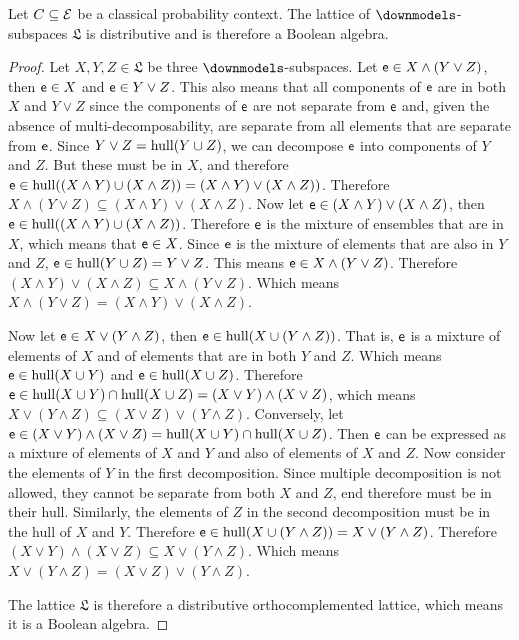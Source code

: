 \begin{prop}
	Let $C \subseteq \mathcal{E}$ be a classical probability context. The lattice of $\separate$-subspaces $\mathfrak{L}$ is distributive and is therefore a Boolean algebra.
\end{prop}

\begin{proof}
	Let $X,Y,Z \in \mathfrak{L}$ be three $\separate$-subspaces. Let $\mathsf{e} \in X \wedge (Y \vee Z)$, then $\mathsf{e} \in X$ and $\mathsf{e} \in Y \vee Z$. This also means that all components of $\mathsf{e}$ are in both $X$ and $Y \vee Z$ since the components of $\mathsf{e}$ are not separate from $\mathsf{e}$ and, given the absence of multi-decomposability, are separate from all elements that are separate from $\mathsf{e}$. Since $Y \vee Z = \mathrm{hull}(Y \cup Z)$, we can decompose $\mathsf{e}$ into components of $Y$ and $Z$. But these must be in $X$, and therefore $\mathsf{e} \in \mathrm{hull}((X \wedge Y) \cup (X \wedge Z) ) = (X \wedge Y) \vee (X \wedge Z) )$. Therefore $X \wedge (Y \vee Z) \subseteq (X \wedge Y) \vee (X \wedge Z)$. Now let $\mathsf{e} \in (X \wedge Y) \vee (X \wedge Z)$, then $\mathsf{e} \in \mathrm{hull}((X \wedge Y) \cup (X \wedge Z) )$. Therefore $\mathsf{e}$ is the mixture of ensembles that are in $X$, which means that $\mathsf{e} \in X$. Since $\mathsf{e}$ is the mixture of elements that are also in $Y$ and $Z$, $\mathsf{e} \in \mathrm{hull}(Y \cup Z) = Y \vee Z$. This means $\mathsf{e} \in X \wedge (Y \vee Z)$. Therefore $(X \wedge Y) \vee (X \wedge Z) \subseteq X \wedge (Y \vee Z)$. Which means $X \wedge (Y \vee Z) = (X \wedge Y) \vee (X \wedge Z)$.
	
	Now let $\mathsf{e} \in X \vee (Y \wedge Z)$, then $\mathsf{e} \in \mathrm{hull}(X \cup (Y \wedge Z) )$. That is, $\mathsf{e}$ is a mixture of elements of $X$ and of elements that are in both $Y$ and $Z$. Which means $\mathsf{e} \in \mathrm{hull}(X \cup Y)$ and $\mathsf{e} \in \mathrm{hull}(X \cup Z)$. Therefore $\mathsf{e} \in \mathrm{hull}(X \cup Y) \cap \mathrm{hull}(X \cup Z) = (X \vee Y) \wedge (X \vee Z)$, which means $X \vee (Y \wedge Z) \subseteq (X \vee Z) \vee (Y \wedge Z)$. Conversely, let $\mathsf{e} \in (X \vee Y) \wedge (X \vee Z) = \mathrm{hull}(X \cup Y) \cap \mathrm{hull}(X \cup Z)$. Then $\mathsf{e}$ can be expressed as a mixture of elements of $X$ and $Y$ and also of elements of $X$ and $Z$. Now consider the elements of $Y$ in the first decomposition. Since multiple decomposition is not allowed, they cannot be separate from both $X$ and $Z$, end therefore must be in their hull. Similarly, the elements of $Z$ in the second decomposition must be in the hull of $X$ and $Y$. Therefore $\mathsf{e} \in \mathrm{hull}(X \cup (Y \wedge Z) ) = X \vee (Y \wedge Z)$. Therefore $(X \vee Y) \wedge (X \vee Z) \subseteq X \vee (Y \wedge Z)$. Which means $X \vee (Y \wedge Z) = (X \vee Z) \vee (Y \wedge Z)$.
	
	The lattice $\mathfrak{L}$ is therefore a distributive orthocomplemented lattice, which means it is a Boolean algebra.
\end{proof}

